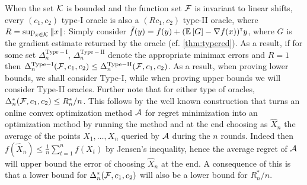 When the set $\mathcal{K}$ is bounded and the function set $\mathcal{F}$ is invariant to linear shifts, every $(c_1,c_2)$ type-I oracle is also a $(R c_1,c_2)$ type-II oracle,
where $R = \sup_{x\in \mathcal{K}} \|x\|$: Simply consider $\tilde{f}(y) =  f(y) + (\mathbb{E}\left[G\right]-\nabla f(x))^\mathsf{\scriptscriptstyle T} y $,
where $G$ is the gradient estimate returned by the oracle (cf. \cref{thm:typered}).
As a result, if for some set $\Delta_{n}^{\mathrm{Type-I}}$, $\Delta_{n}^{\mathrm{Type-II}}$
denote the appropriate minimax errors and $R=1$
then $\Delta_{n}^{\mathrm{Type-I}}(\mathcal{F},c_1,c_2) \le \Delta_{n}^{\mathrm{Type-II}}(\mathcal{F}, c_1,c_2)  $.
As a result, when proving lower bounds, we shall consider Type-I, while when proving upper bounds we will consider Type-II oracles.
Further note that for either type of oracles, $\Delta_n^*(\mathcal{F},c_1,c_2) \le R_n^*/n$. This follows by the well known construction that turns an online convex optimization method $\mathcal{A}$ for regret minimization into an optimization method by running the method and at the end choosing as $\hat{X}_n$ the average of the points $X_1,\dots,X_n$ queried by $\mathcal{A}$ during the $n$ rounds.
Indeed then $f(\hat{X}_n) \le \frac1n \sum_{t=1}^n f(X_t)$ by Jensen's inequality, hence the average regret of $\mathcal{A}$ will upper bound the error of choosing $\hat{X}_n$ at the end.
A consequence of this is that a lower bound for $\Delta_n^*(\mathcal{F},c_1,c_2) $ will also be a lower bound for $R_n^*/n$.
